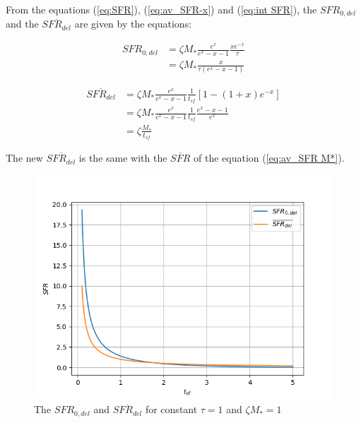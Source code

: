 \documentclass[a4paper,twocolumn]{article}
\begin{document}
From the equations (\ref{eq:SFR}), (\ref{eq:av_SFR-x}) and (\ref{eq:int SFR}), the \(SFR_{0,del}\) and the \(\overline{SFR_{del}}\) are given by the equations:

\begin{equation} \label{eq:SFR final}
\begin{align}
SFR_{0,del}&=\zeta M_*\frac{e^x}{e^x-x-1}\frac{xe^{-x}}{\tau}\\
          &=\zeta M_*\frac{x}{\tau(e^x-x-1)}
\end{align}
\end{equation}


\begin{equation}\label{eq:av_SFR-x final}
\begin{align}
\overline{SFR_{del}}&=\zeta M_*\frac{e^x}{e^x-x-1}\frac{1}{t_{sf}}[1-(1+x)e^{-x}]\\
                   &=\zeta M_*\frac{e^x}{e^x-x-1}\frac{1}{t_{sf}}\frac{e^x-x-1}{e^x}\\
                   &=\zeta \frac{M_*}{t_{sf}}
\end{align}
\end{equation}

The new \(\overline{SFR_{del}}\) is the same with the \(\overline{SFR}\) of the equation (\ref{eq:av_SFR M*}).


\begin{figure}[!htpb]
\centering
\includegraphics[width=.9\linewidth]{./figs/SFR_avSFR.png}
\caption{\label{fig:The $SFR_{0,del}$ and $\overline{SFR_{del}}$ for constant $\tau=1$ and $\zeta M_*=1$}The \(SFR_{0,del}\) and \(\overline{SFR_{del}}\) for constant \(\tau=1\) and \(\zeta M_*=1\)}
\end{figure}
\end{document}
